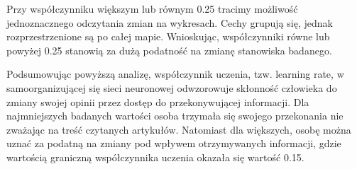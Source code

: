 \documentclass[11pt]{article}
\begin{document}
Przy współczynniku większym lub równym 0.25 tracimy możliwość jednoznacznego odczytania zmian na wykresach. Cechy grupują się, jednak rozprzestrzenione są po całej mapie. Wnioskując, współczynniki równe lub powyżej 0.25 stanowią za dużą podatność na zmianę stanowiska badanego.

Podsumowując powyższą analizę, współczynnik uczenia, tzw. learning rate, w samoorganizującej się sieci neuronowej odwzorowuje skłonność człowieka do zmiany swojej opinii przez dostęp do przekonywującej informacji. Dla najmniejszych badanych wartości osoba trzymała się swojego przekonania nie zważając na treść czytanych artykułów. Natomiast dla większych, osobę można uznać za podatną na zmiany pod wpływem otrzymywanych informacji, gdzie wartością graniczną współczynnika uczenia okazała się wartość 0.15.
\end{document}

